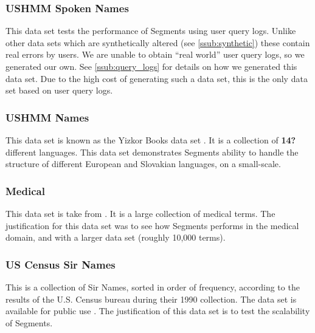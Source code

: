 \documentclass{article}
\begin{document}
\subsubsection{USHMM Spoken Names} %
\label{ssub:ushmm_spoken_names}
This data set tests the performance of Segments using user query logs.  Unlike other data sets which are synthetically altered (see \ref{ssub:synthetic}) these contain real errors by users.  We are unable to obtain ``real world'' user query logs, so we generated our own.  See \ref{ssub:query_logs} for details on how we generated this data set.  Due to the high cost of generating such a data set, this is the only data set based on user query logs.


\subsubsection{USHMM Names} %
\label{ssub:ushmm_names}
This data set is known as the Yizkor Books data set \cite{amir:from}.  It is a collection of \textbf{14?} different languages.  This data set demonstrates Segments ability to handle the structure of different European and Slovakian languages, on a small-scale.


\subsubsection{Medical} %
\label{ssub:medical}
This data set is take from \cite{link:spellingzone}.  It is a large collection of medical terms.  The justification for this data set was to see how Segments performs in the medical domain, and with a larger data set (roughly 10,000 terms).


\subsubsection{US Census Sir Names} %
\label{ssub:us_census_sir_names}
This is a collection of Sir Names, sorted in order of frequency, according to the results of the U.S. Census bureau during their 1990 collection.  The data set is available for public use \cite{us_census_bureau}.  The justification of this data set is to test the scalability of Segments.


\end{document}
